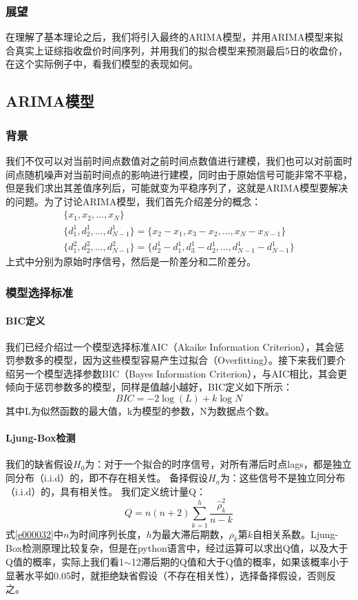 \documentclass{article}
\begin{document}
\subsubsection{展望}
在理解了基本理论之后，我们将引入最终的ARIMA模型，并用ARIMA模型来拟合真实上证综指收盘价时间序列，并用我们的拟合模型来预测最后5日的收盘价，在这个实际例子中，看我们模型的表现如何。
\subsection{ARIMA模型}
\subsubsection{背景}
我们不仅可以对当前时间点数值对之前时间点数值进行建模，我们也可以对前面时间点随机噪声对当前时间点的影响进行建模，同时由于原始信号可能非常不平稳，但是我们求出其差值序列后，可能就变为平稳序列了，这就是ARIMA模型要解决的问题。为了讨论ARIMA模型，我们首先介绍差分的概念：
\begin{equation}
\begin{aligned}
\{ x_1,x_2,...,x_N \} \\
\{d_1^{1},d_2^{1},...,d_{N-1}^{1}\}=\{x_2-x_1,x_3-x_2,...,x_{N}-x_{N-1}\} \\
\{d_1^{2},d_2^{2},...,d_{N-1}^{2}\}=\{d_2^{1}-d_1^{1},d_3^{1}-d_2^{1},...,d_{N-1}^{1}-d_{N-1}^{1}\}
\end{aligned}
\label{e000030}
\end{equation}
上式中分别为原始时序信号，然后是一阶差分和二阶差分。
\subsubsection{模型选择标准}
\paragraph{BIC定义}
我们已经介绍过一个模型选择标准AIC（Akaike Information Criterion），其会惩罚参数多的模型，因为这些模型容易产生过拟合（Overfitting）。接下来我们要介绍另一个模型选择参数BIC（Bayes Information Criterion），与AIC相比，其会更倾向于惩罚参数多的模型，同样是值越小越好，BIC定义如下所示：
\begin{equation}
BIC=-2\log (L) + k \log N
\label{e000031}
\end{equation}
其中L为似然函数的最大值，k为模型的参数，N为数据点个数。
\paragraph{Ljung-Box检测}
我们的缺省假设$H_{0}$为：对于一个拟合的时序信号，对所有滞后时点lags，都是独立同分布（i.i.d）的，即不存在相关性。\newline
备择假设$H_{a}$为：这些信号不是独立同分布（i.i.d）的，具有相关性。\newline
我们定义统计量Q：
\begin{equation}
Q=n(n+2)\sum_{k=1}^{h} \frac{\hat{\rho}_{k}^{2}}{n-k}
\label{e000032}
\end{equation}
式\ref{e000032}中$n$为时间序列长度，$h$为最大滞后期数，$\rho _{k}$第$k$自相关系数。Ljung-Box检测原理比较复杂，但是在python语言中，经过运算可以求出Q值，以及大于Q值的概率，实际上我们看1$\sim$12滞后期的Q值和大于Q值的概率，如果该概率小于显著水平如0.05时，就拒绝缺省假设（不存在相关性），选择备择假设，否则反之。
\end{document}
